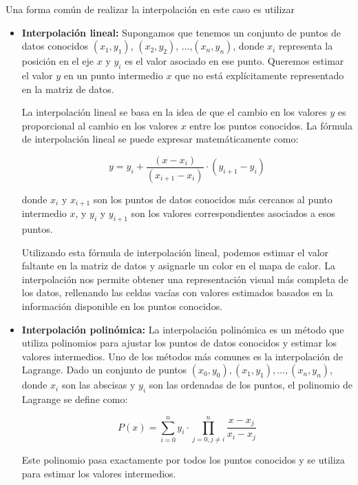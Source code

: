 \documentclass{article}
\begin{document}
\begin{itemize}
Una forma común de realizar la interpolación en este caso es utilizar



\begin{itemize}
\item  \textbf{Interpolación lineal: }Supongamos que tenemos un conjunto de puntos de datos conocidos $(x_1, y_1)$, $(x_2, y_2)$, $\ldots$,$ (x_n, y_n)$, donde $x_i$ representa la posición en el eje $x$ y $y_i$ es el valor asociado en ese punto. Queremos estimar el valor $y$ en un punto intermedio $x$ que no está explícitamente representado en la matriz de datos.

La interpolación lineal se basa en la idea de que el cambio en los valores $y$ es proporcional al cambio en los valores $x$ entre los puntos conocidos. La fórmula de interpolación lineal se puede expresar matemáticamente como:

\begin{equation}
y = y_i + \frac{{(x - x_i)}}{{(x_{i+1} - x_i)}} \cdot (y_{i+1} - y_i)
\end{equation}

donde $x_i$ y $x_{i+1}$ son los puntos de datos conocidos más cercanos al punto intermedio $x$, y $y_i$ y $y_{i+1}$ son los valores correspondientes asociados a esos puntos.

Utilizando esta fórmula de interpolación lineal, podemos estimar el valor faltante en la matriz de datos y asignarle un color en el mapa de calor. La interpolación nos permite obtener una representación visual más completa de los datos, rellenando las celdas vacías con valores estimados basados en la información disponible en los puntos conocidos.

\item   \textbf{Interpolación polinómica:}
La interpolación polinómica es un método que utiliza polinomios para ajustar los puntos de datos conocidos y estimar los valores intermedios. Uno de los métodos más comunes es la interpolación de Lagrange. Dado un conjunto de puntos $(x_0, y_0), (x_1, y_1), \ldots, (x_n, y_n)$, donde $x_i$ son las abscisas y $y_i$ son las ordenadas de los puntos, el polinomio de Lagrange se define como:

\begin{equation}
    P(x) = \sum_{i=0}^{n} y_i \cdot \prod_{j=0, j \neq i}^{n} \frac{x - x_j}{x_i - x_j}
\end{equation}

Este polinomio pasa exactamente por todos los puntos conocidos y se utiliza para estimar los valores intermedios.


\end{itemize}
\end{itemize}
\end{document}
